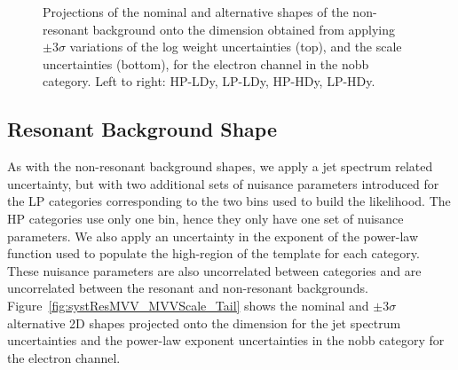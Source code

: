 \begin{figure}[htbp]
  \caption{
    Projections of the nominal and alternative shapes of the non-resonant background onto the \MJ dimension obtained from applying $\pm3\sigma$ variations of the log weight uncertainties (top), and the \MJ scale uncertainties (bottom), for the electron channel in the nobb category.
    Left to right: HP-LDy, LP-LDy, HP-HDy, LP-HDy.
  }
  \label{fig:systNonResMJ_logWeight_Scale}
\end{figure}

\subsection{Resonant Background Shape}

As with the non-resonant background shapes, we apply a jet \pt spectrum related uncertainty, but with two additional sets of nuisance parameters introduced for the LP categories corresponding to the two \MJ bins used to build the \MVV likelihood.
The HP categories use only one \MJ bin, hence they only have one set of nuisance parameters.
We also apply an uncertainty in the exponent of the power-law function used to populate the high-\MVV region of the template for each category.
These nuisance parameters are also uncorrelated between categories and are uncorrelated between the resonant and non-resonant backgrounds.
Figure~\ref{fig:systResMVV_MVVScale_Tail} shows the nominal and $\pm3\sigma$ alternative 2D shapes projected onto the \MVV dimension for the jet \pt spectrum uncertainties and the \MVV power-law exponent uncertainties in the nobb category for the electron channel.

